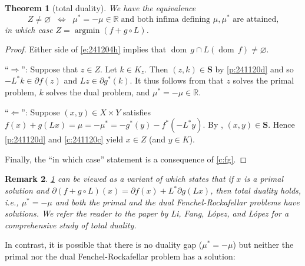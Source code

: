 \documentclass{article}
\providecommand{\siff}{\Leftrightarrow}
\newcommand{\RR}{\ensuremath{\mathbb R}}
\newcommand{\dom}{\ensuremath{\operatorname{dom}}\,}
\DeclareMathOperator*{\argmin}{argmin}
\newcommand{\bKT}{\ensuremath{{\mathbf{S}}}}
\newtheorem{theorem}{Theorem}[section]
\newtheorem{remark}[theorem]{Remark}
\begin{document}
\begin{theorem}[total duality]
\label{t:td}
We have the equivalence
\begin{equation}
\label{e:241204h}
Z\neq\varnothing
\;\;\siff\;\;
\mu^*=-\mu\in \RR\; \text{and both infima defining $\mu,\mu^*$ are attained,}
\end{equation}
in which case 
$Z=\argmin(f+g\circ L)$. 
\end{theorem}
\begin{proof}
Either side of \cref{e:241204h} implies 
that $\dom g\cap L(\dom f)\neq\varnothing$.

``$\Rightarrow$'':
Suppose that $z\in Z$. 
Let $k\in K_z$. 
Then $(z,k)\in\bKT$ by \cref{p:241120d} and so 
$-L^*k\in \partial f(z)$ and $Lz \in \partial g^*(k)$. 
It thus follows from \cite[Theorem~19.1]{BC2017} that 
$z$ solves the primal problem, $k$ solves the dual problem, 
and $\mu^*=-\mu\in\RR$. 

``$\Leftarrow$'': 
Suppose 
$(x,y)\in X\times Y$ satisfies
$f(x)+g(Lx)=\mu=-\mu^*=-g^*(y)-f^*(-L^*y)$. 
By \cite[Theorem~19.1]{BC2017}, $(x,y)\in\bKT$. 
Hence \cref{p:241120d} and \cref{c:241120c} yield $x\in Z$ (and $y\in K$). 

Finally, the ``in which case'' statement is a consequence of \cref{c:fg}. 
\end{proof}

\begin{remark}
\cref{t:td} can be viewed as a variant of 
\cite[Corollary~5.3]{LFLL} which states that 
if $x$ is a primal solution and $\partial(f+g\circ L)(x) = \partial 
f(x) + L^*\partial g(Lx)$, then \emph{total duality} holds, 
i.e., $\mu^*=-\mu$ and both the primal and the dual Fenchel-Rockafellar 
problems have solutions. 
We refer the reader to the paper \cite{LFLL} by Li, Fang, L\'opez, and L\'opez for a
comprehensive study of total duality. 
\end{remark}

In contrast, it is possible that there is no duality gap ($\mu^*=-\mu$) but neither 
the primal nor the dual Fenchel-Rockafellar problem has a solution:
\end{document}
